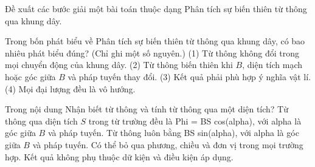 \begin{bt}
Đề xuất các bước giải một bài toán thuộc dạng Phân tích sự biến thiên từ thông qua khung dây.
\end{bt}

\begin{ex}
Trong bốn phát biểu về Phân tích sự biến thiên từ thông qua khung dây, có bao nhiêu phát biểu đúng? (Chỉ ghi một số nguyên.) (1) Từ thông không đổi trong mọi chuyển động của khung dây. (2) Từ thông biến thiên khi $B$, diện tích mạch hoặc góc giữa $B$ và pháp tuyến thay đổi. (3) Kết quả phải phù hợp ý nghĩa vật lí. (4) Mọi đại lượng đều là vô hướng.
\end{ex}

\begin{ex}
Trong nội dung Nhận biết từ thông và tính từ thông qua một diện tích?
\choice
{\True Từ thông qua diện tích $S$ trong từ trường đều là Phi = BS cos(alpha), với alpha là góc giữa $B$ và pháp tuyến.}
{Từ thông luôn bằng BS sin(alpha), với alpha là góc giữa $B$ và pháp tuyến.}
{Có thể bỏ qua phương, chiều và đơn vị trong mọi trường hợp.}
{Kết quả không phụ thuộc dữ kiện và điều kiện áp dụng.}
\end{ex}

